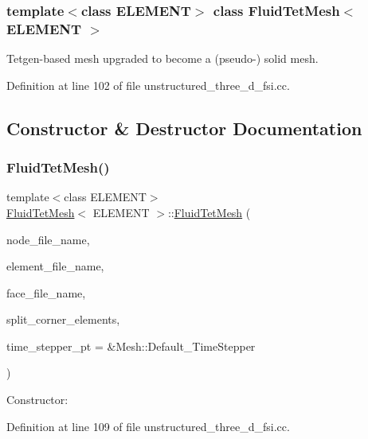 \subsubsection*{template$<$class E\+L\+E\+M\+E\+NT$>$\newline
class Fluid\+Tet\+Mesh$<$ E\+L\+E\+M\+E\+N\+T $>$}

Tetgen-\/based mesh upgraded to become a (pseudo-\/) solid mesh. 

Definition at line 102 of file unstructured\+\_\+three\+\_\+d\+\_\+fsi.\+cc.



\subsection{Constructor \& Destructor Documentation}
\mbox{\label{classFluidTetMesh_a5f8ea145d68623198abc97209a0491a6}} 
\subsubsection{\texorpdfstring{Fluid\+Tet\+Mesh()}{FluidTetMesh()}}
{\footnotesize\ttfamily template$<$class E\+L\+E\+M\+E\+NT$>$ \\
\hyperlink{classFluidTetMesh}{Fluid\+Tet\+Mesh}$<$ E\+L\+E\+M\+E\+NT $>$\+::\hyperlink{classFluidTetMesh}{Fluid\+Tet\+Mesh} (\begin{DoxyParamCaption}\item[{const std\+::string \&}]{node\+\_\+file\+\_\+name,  }\item[{const std\+::string \&}]{element\+\_\+file\+\_\+name,  }\item[{const std\+::string \&}]{face\+\_\+file\+\_\+name,  }\item[{const bool \&}]{split\+\_\+corner\+\_\+elements,  }\item[{Time\+Stepper $\ast$}]{time\+\_\+stepper\+\_\+pt = {\ttfamily \&Mesh\+:\+:Default\+\_\+TimeStepper} }\end{DoxyParamCaption})\hspace{0.3cm}{\ttfamily [inline]}}



Constructor\+: 



Definition at line 109 of file unstructured\+\_\+three\+\_\+d\+\_\+fsi.\+cc.

